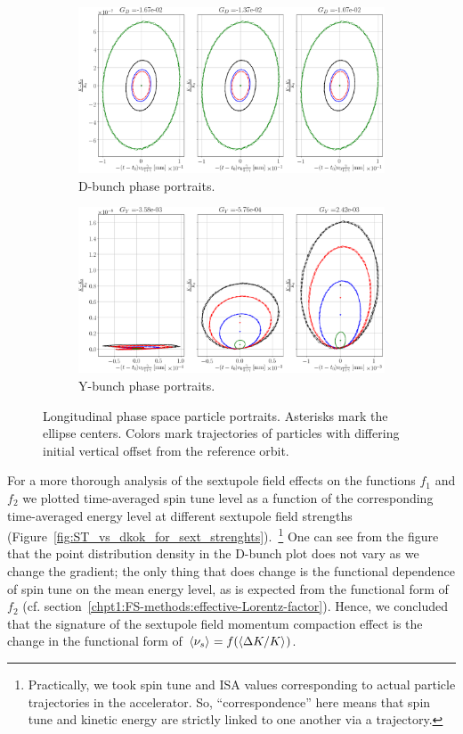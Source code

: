 \begin{figure}[h]
	\centering
	\begin{subfigure}{\linewidth}
		\includegraphics[width=\linewidth]{images/decoh_sim/propdef/long_phase_space_for_sext_settings_D}
		\caption{D-bunch phase portraits.}
	\end{subfigure}
	\begin{subfigure}{\linewidth}
		\includegraphics[width=\linewidth]{images/decoh_sim/propdef/long_phase_space_for_sext_settings_Y}
		\caption{Y-bunch phase portraits.}
	\end{subfigure}
	\caption{Longitudinal phase space particle portraits. Asterisks mark the ellipse centers.
		Colors mark trajectories of particles with differing initial vertical offset from the reference orbit.\label{fig:long_PS_sext_settings}}
\end{figure}

For a more thorough analysis of the sextupole field effects on the functions $f_1$ and $f_2$ we plotted  time-averaged spin tune level as a function of the corresponding time-averaged energy level at different
sextupole field strengths (Figure~\ref{fig:ST_vs_dkok_for_sext_strenghts}).~\footnote{Practically, 
	we took spin tune and ISA values corresponding to actual particle trajectories in the accelerator.
	So, ``correspondence'' here means that spin tune and kinetic energy are strictly linked to one another via
	a trajectory.} One can see from the figure 
that the point distribution density in the D-bunch plot does not vary as we change the gradient; the only thing 
that does change is the functional dependence of spin tune on the mean energy level, as is expected from
the functional form of $f_2$ (cf. section~\ref{chpt1:FS-methods:effective-Lorentz-factor}). Hence, we concluded
that the signature of the sextupole field momentum compaction effect is the change in the functional form of
 $\avg{\nu_s} = f(\avg{\Delta K/K})$.

